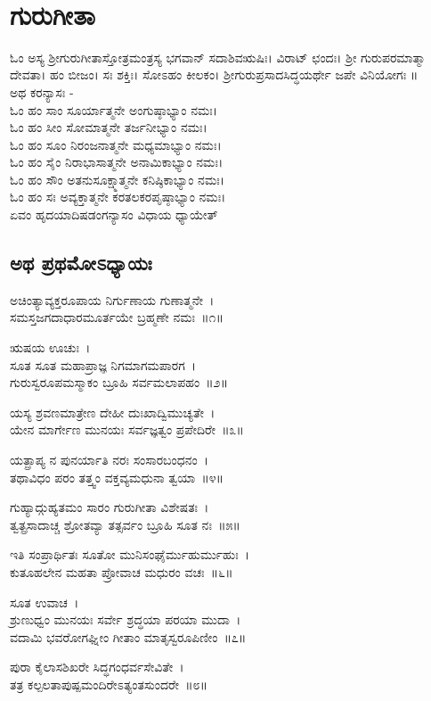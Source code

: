‌\chapter*{\center ಗುರುಗೀತಾ}
ಓಂ ಅಸ್ಯ ಶ್ರೀಗುರುಗೀತಾಸ್ತೋತ್ರಮಂತ್ರಸ್ಯ ಭಗವಾನ್ ಸದಾಶಿವಋಷಿಃ। ವಿರಾಟ್ ಛಂದಃ। ಶ್ರೀ ಗುರುಪರಮಾತ್ಮಾ ದೇವತಾ। ಹಂ ಬೀಜಂ। ಸಃ ಶಕ್ತಿಃ। ಸೋಽಹಂ ಕೀಲಕಂ। ಶ್ರೀಗುರುಪ್ರಸಾದಸಿದ್ಧಯರ್ಥೇ ಜಪೇ ವಿನಿಯೋಗಃ ॥\\

ಅಥ ಕರನ್ಯಾಸಃ -\\
ಓಂ ಹಂ ಸಾಂ ಸೂರ್ಯಾತ್ಮನೇ ಅಂಗುಷ್ಠಾಭ್ಯಾಂ ನಮಃ।\\
ಓಂ ಹಂ ಸೀಂ ಸೋಮಾತ್ಮನೇ ತರ್ಜನೀಭ್ಯಾಂ ನಮಃ।\\
ಓಂ ಹಂ ಸೂಂ ನಿರಂಜನಾತ್ಮನೇ ಮಧ್ಯಮಾಭ್ಯಾಂ ನಮಃ।\\
ಓಂ ಹಂ ಸೈಂ ನಿರಾಭಾಸಾತ್ಮನೇ ಅನಾಮಿಕಾಭ್ಯಾಂ ನಮಃ।\\
ಓಂ ಹಂ ಸೌಂ ಅತನುಸೂಕ್ಷ್ಮಾತ್ಮನೇ ಕನಿಷ್ಠಿಕಾಭ್ಯಾಂ ನಮಃ।\\
ಓಂ ಹಂ ಸಃ ಅವ್ಯಕ್ತಾತ್ಮನೇ ಕರತಲಕರಪೃಷ್ಠಾಭ್ಯಾಂ ನಮಃ।\\
ಏವಂ ಹೃದಯಾದಿಷಡಂಗನ್ಯಾಸಂ ವಿಧಾಯ ಧ್ಯಾಯೇತ್\-\\
\section{ಅಥ ಪ್ರಥಮೋಽಧ್ಯಾಯಃ}
ಅಚಿಂತ್ಯಾವ್ಯಕ್ತರೂಪಾಯ ನಿರ್ಗುಣಾಯ ಗುಣಾತ್ಮನೇ~।\\
ಸಮಸ್ತಜಗದಾಧಾರಮೂರ್ತಯೇ ಬ್ರಹ್ಮಣೇ ನಮಃ~॥೧॥

ಋಷಯ ಊಚುಃ~।\\
ಸೂತ ಸೂತ ಮಹಾಪ್ರಾಜ್ಞ ನಿಗಮಾಗಮಪಾರಗ~।\\
ಗುರುಸ್ವರೂಪಮಸ್ಮಾಕಂ ಬ್ರೂಹಿ ಸರ್ವಮಲಾಪಹಂ~॥೨॥

ಯಸ್ಯ ಶ್ರವಣಮಾತ್ರೇಣ ದೇಹೀ ದುಃಖಾದ್ವಿಮುಚ್ಯತೇ~।\\
ಯೇನ ಮಾರ್ಗೇಣ ಮುನಯಃ ಸರ್ವಜ್ಞತ್ವಂ ಪ್ರಪೇದಿರೇ~॥೩॥

ಯತ್ಪ್ರಾಪ್ಯ ನ ಪುನರ್ಯಾತಿ ನರಃ ಸಂಸಾರಬಂಧನಂ~।\\
ತಥಾವಿಧಂ ಪರಂ ತತ್ತ್ವಂ ವಕ್ತವ್ಯಮಧುನಾ ತ್ವಯಾ~॥೪॥

ಗುಹ್ಯಾದ್ಗುಹ್ಯತಮಂ ಸಾರಂ ಗುರುಗೀತಾ ವಿಶೇಷತಃ~।\\
ತ್ವತ್ಪ್ರಸಾದಾಚ್ಚ ಶ್ರೋತವ್ಯಾ ತತ್ಸರ್ವಂ ಬ್ರೂಹಿ ಸೂತ ನಃ~॥೫॥

ಇತಿ ಸಂಪ್ರಾರ್ಥಿತಃ ಸೂತೋ ಮುನಿಸಂಘೈರ್ಮುಹುರ್ಮುಹುಃ~।\\
ಕುತೂಹಲೇನ ಮಹತಾ ಪ್ರೋವಾಚ ಮಧುರಂ ವಚಃ~॥೬॥

ಸೂತ ಉವಾಚ~।\\
ಶ್ರುಣುಧ್ವಂ ಮುನಯಃ ಸರ್ವೇ ಶ್ರದ್ಧಯಾ ಪರಯಾ ಮುದಾ~।\\
ವದಾಮಿ ಭವರೋಗಘ್ನೀಂ ಗೀತಾಂ ಮಾತೃಸ್ವರೂಪಿಣೀಂ~॥೭॥

ಪುರಾ ಕೈಲಾಸಶಿಖರೇ ಸಿದ್ಧಗಂಧರ್ವಸೇವಿತೇ~।\\
ತತ್ರ ಕಲ್ಪಲತಾಪುಷ್ಪಮಂದಿರೇಽತ್ಯಂತಸುಂದರೇ~॥೮॥

